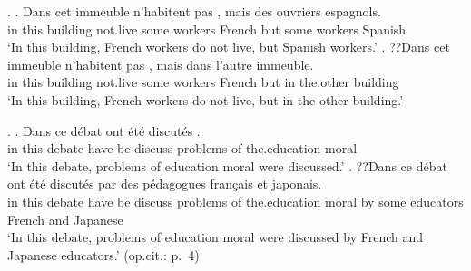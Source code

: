 
%
\ex.
 \ag. Dans cet immeuble n'habitent pas   , mais des ouvriers espagnols. \\
      in this building not.live  some workers French but some workers Spanish \\
      `In this building, French workers do not live, but Spanish workers.'
 \bg. ??Dans cet immeuble n'habitent pas   , mais dans l'autre immeuble. \\
      in this building not.live  some workers French but in the.other building \\
      `In this building, French workers do not live, but in the other building.'\\
      \hfill{\cite[p.~3, translated by the current author]{togoohki86}}

%
\ex.
 \ag. Dans ce d\'{e}bat ont \'{e}t\'{e} discut\'{e}s    . \\
      in this debate have be discuss problems of the.education moral \\
      `In this debate, problems of education moral were discussed.'
 \bg. ??Dans ce d\'{e}bat ont \'{e}t\'{e} discut\'{e}s     par des p\'{e}dagogues fran\c{c}ais et japonais. \\
      in this debate have be discuss problems of the.education moral by some educators French and Japanese \\
      `In this debate, problems of education moral were discussed by French and Japanese educators.'
      \hfill{(op.cit.: p.~4)}

